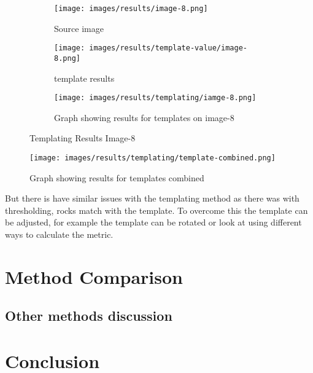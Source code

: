 \begin{figure}[H]
    \centering
    
    \begin{subfigure}{0.5\textwidth}
        \centering
        \texttt{[image: images/results/image-8.png]}
        \caption{Source image}
    \end{subfigure}%
    \begin{subfigure}{0.5\textwidth}
        \centering
        \texttt{[image: images/results/template-value/image-8.png]}
        \caption{template results}
    \end{subfigure}
    \begin{subfigure}{\textwidth}
    \centering
        \texttt{[image: images/results/templating/iamge-8.png]}
        \caption{Graph showing results for templates on image-8}
    \end{subfigure}
    
    \caption{Templating Results Image-8}
    \label{fig:Templating-Results-Image-8}
\end{figure}


\begin{figure}[H]
    \centering
    \texttt{[image: images/results/templating/template-combined.png]}
    \caption{Graph showing results for templates combined}
    \label{fig:Templating-Results-combined}
\end{figure}

But there is have similar issues with the templating method as there was with thresholding, rocks match with the template. To overcome this the template can be adjusted, for example the template can be rotated or look at using different ways to calculate the metric.\cite{opencv-python}


    
    

\section{Method Comparison}

\subsection{Other methods discussion}

\section{Conclusion}